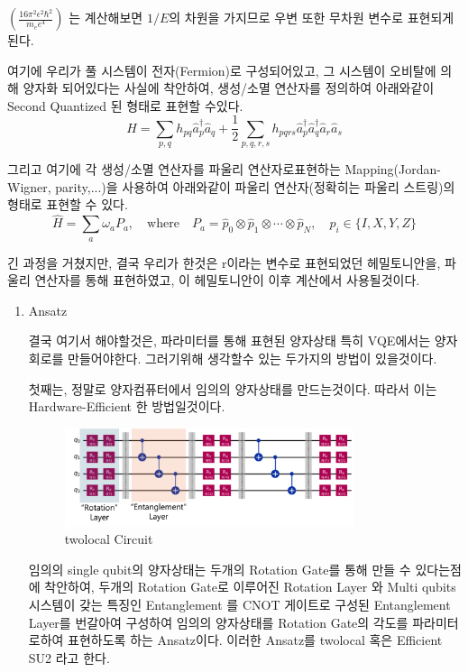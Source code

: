 \documentclass[10pt]{article}
\begin{document}
\begin{enumerate}[label=3)]
\begin{enumerate}[label=\(\mathrm{i}\))]
\(\left(\frac{16\pi^2\epsilon^2\hbar^2}{m_ee^4}\right)\) 는 계산해보면 \(1/E\)의 차원을 가지므로 우변 또한 무차원 변수로 표현되게 된다. 

여기에 우리가 풀 시스템이 전자(Fermion)로 구성되어있고, 그 시스템이 오비탈에 의해 양자화 되어있다는 사실에 착안하여, 생성/소멸 연산자를 정의하여 아래와같이 Second Quantized 된 형태로 표현할 수있다. 
\[
\hat{H} = \sum_{p,q} h_{pq} \hat{a}_p^\dagger \hat{a}_q
+ \frac{1}{2} \sum_{p,q,r,s} h_{pqrs} \hat{a}_p^\dagger \hat{a}_q^\dagger \hat{a}_r \hat{a}_s
\]

그리고 여기에 각 생성/소멸 연산자를 파울리 연산자로표현하는 Mapping(Jordan-Wigner, parity,...)을 사용하여 아래와같이 파울리 연산자(정확히는 파울리 스트링)의 형태로 표현할 수 있다. 
\[
\hat{H} = \sum_{a} \omega_a P_a, \quad \text{where} \quad
P_a = \hat{p}_0 \otimes \hat{p}_1 \otimes \cdots \otimes \hat{p}_N, \quad
\hat{p}_i \in \{I, X, Y, Z\}
\]

긴 과정을 거쳤지만, 결국 우리가 한것은 r이라는 변수로 표현되었던 헤밀토니안을, 파울리 연산자를 통해 표현하였고, 이 헤밀토니안이 이후 계산에서 사용될것이다. 

\end{enumerate}

\begin{enumerate}[label=\(\mathrm{ii}\))]
\item {Ansatz}


결국 여기서 해야할것은, 파라미터를 통해 표현된 양자상태 특히 VQE에서는 양자회로를 만들어야한다. 
그러기위해 생각할수 있는 두가지의 방법이 있을것이다. 

첫째는, 정말로 양자컴퓨터에서 임의의 양자상태를 만드는것이다. 따라서 이는 Hardware-Efficient 한 방법일것이다. 

\begin{figure}[H]
  \centering
  \includegraphics[width=0.8\textwidth]{fig/twolocal.png}
  \caption{twolocal Circuit}
  \label{fig:example3}
\end{figure}

임의의 single qubit의 양자상태는 두개의 Rotation Gate를 통해 만들 수 있다는점에 착안하여, 
두개의 Rotation Gate로 이루어진 Rotation Layer 와 Multi qubits 시스템이 갖는 특징인 Entanglement 를 CNOT 게이트로 구성된 Entanglement Layer를 번갈아여 구성하여
임의의 양자상태를 Rotation Gate의 각도를 파라미터로하여 표현하도록 하는 Ansatz이다. 이러한 Ansatz를 twolocal 혹은 Efficient SU2 라고 한다. 


\end{enumerate}
\end{enumerate}
\end{document}

